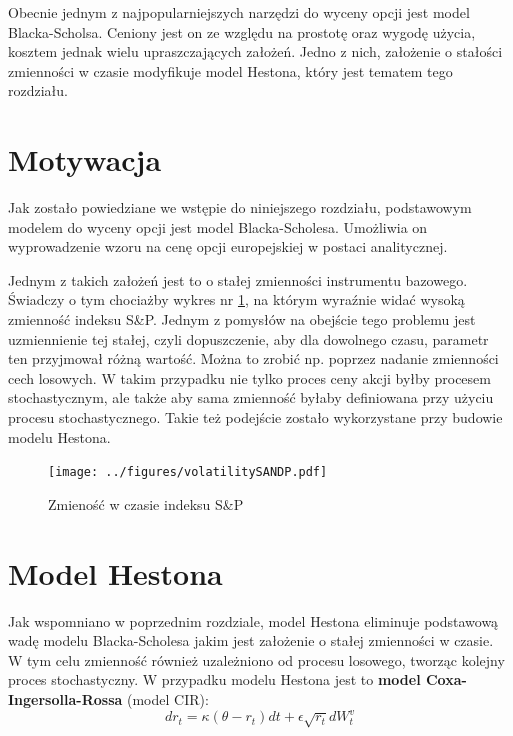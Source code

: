 \documentclass{pracamgr}
\begin{document}
Obecnie jednym z najpopularniejszych narzędzi do wyceny opcji jest model Blacka-Scholsa. Ceniony jest on ze względu na prostotę oraz wygodę użycia, kosztem jednak wielu upraszczających założeń. 
Jedno z nich, założenie o stałości zmienności w czasie modyfikuje model Hestona, który jest 
tematem tego rozdziału.


\section{Motywacja} 
Jak zostało powiedziane we wstępie do niniejszego rozdziału, podstawowym modelem do wyceny opcji jest model Blacka-Scholesa.
Umożliwia on wyprowadzenie wzoru na cenę opcji europejskiej w postaci analitycznej. 

Jednym z takich założeń jest to o stałej zmienności instrumentu bazowego. Świadczy o tym chociażby
wykres nr \ref{fig:vix}, na którym wyraźnie widać wysoką zmienność indeksu S\&P. Jednym z pomysłów na obejście tego problemu jest uzmiennienie tej stałej, czyli dopuszczenie, aby dla dowolnego czasu, parametr ten przyjmował różną wartość. Można to zrobić np. poprzez nadanie zmienności cech losowych. W takim przypadku nie tylko proces ceny akcji byłby procesem stochastycznym, ale także aby sama zmienność byłaby definiowana przy użyciu procesu stochastycznego. Takie też podejście zostało wykorzystane przy budowie modelu Hestona. \cite{greenwade93}



\begin{figure}
  \centering  
  \texttt{[image: ../figures/volatilitySANDP.pdf]}
  \caption{Zmieność w czasie indeksu S\&P}\label{fig:vix}
\end{figure} 

\section{Model Hestona}
Jak wspomniano w poprzednim rozdziale, model Hestona eliminuje podstawową wadę modelu Blacka-Scholesa jakim jest założenie o stałej zmienności w czasie.
W tym celu zmienność również uzależniono od procesu losowego, tworząc kolejny proces stochastyczny. W przypadku modelu Hestona jest to \textbf{model Coxa-Ingersolla-Rossa} (model CIR):
\begin{equation}
dr_t  = \kappa (\theta  - r_t)dt + \epsilon \sqrt{r_t} dW_t^v 
\end{equation}
\end{document}
